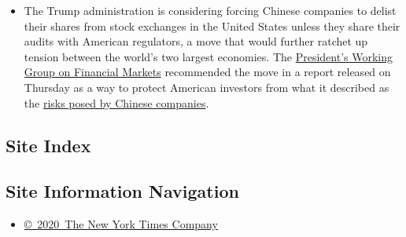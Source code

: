 \begin{itemize}
\item
  The Trump administration is considering forcing Chinese companies to
  delist their shares from stock exchanges in the United States unless
  they share their audits with American regulators, a move that would
  further ratchet up tension between the world's two largest economies.
  The
  \href{https://www.nytimes3xbfgragh.onion/live/2020/08/06/business/stock-market-today-coronavirus/us-may-insist-chinese-companies-share-audits-or-delist-their-shares-from-american-exchanges}{President's
  Working Group on Financial Markets} recommended the move in a report
  released on Thursday as a way to protect American investors from what
  it described as the
  \href{https://www.nytimes3xbfgragh.onion/2012/07/13/business/in-china-inspecting-the-inspectors.html}{risks
  posed by Chinese companies}.
\end{itemize}

\hypertarget{site-index}{%
\subsection{Site Index}\label{site-index}}

\hypertarget{site-information-navigation}{%
\subsection{Site Information
Navigation}\label{site-information-navigation}}

\begin{itemize}
\tightlist
\item
  \href{https://help.nytimes3xbfgragh.onion/hc/en-us/articles/115014792127-Copyright-notice}{©~2020~The
  New York Times Company}
\end{itemize}

